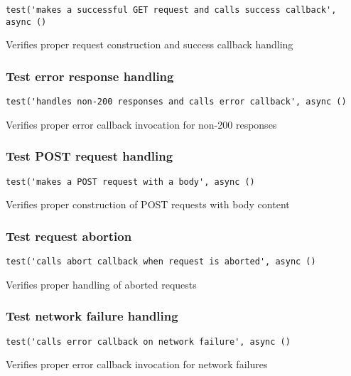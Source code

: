 \documentclass[a4paper]{article}
\begin{document}
\begin{lstlisting}
test('makes a successful GET request and calls success callback', async ()
\end{lstlisting}

Verifies proper request construction and success callback handling

\hypertarget{toc511}{}
\subsubsection{Test error response handling}

\begin{lstlisting}
test('handles non-200 responses and calls error callback', async ()
\end{lstlisting}

Verifies proper error callback invocation for non-200 responses

\hypertarget{toc512}{}
\subsubsection{Test POST request handling}

\begin{lstlisting}
test('makes a POST request with a body', async ()
\end{lstlisting}

Verifies proper construction of POST requests with body content

\hypertarget{toc513}{}
\subsubsection{Test request abortion}

\begin{lstlisting}
test('calls abort callback when request is aborted', async ()
\end{lstlisting}

Verifies proper handling of aborted requests

\hypertarget{toc514}{}
\subsubsection{Test network failure handling}

\begin{lstlisting}
test('calls error callback on network failure', async ()
\end{lstlisting}

Verifies proper error callback invocation for network failures
\end{document}
